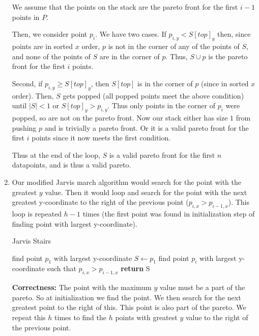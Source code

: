 \documentclass[11pt]{article}
\begin{document}
\begin{enumerate}[1. ]
    We assume that the points on the stack are the pareto front for the first $i-1$ points in $P$.

    Then, we consider point $p_i$. We have two cases. If $p_{i,y} < S[top]_y$ then, since points are in sorted $x$ order,
    $p$ is not in the corner of any of the points of $S$, and none of the points of $S$ are in the corner of $p$. Thus, $S \cup p$
    is the pareto front for the first $i$ points.

    Second, if $p_{i,y} \geq S[top]_y$, then $S[top]$ is in the corner of $p$ (since in sorted $x$ order). Then,
    $S$ gets popped (all popped points meet the above condition) until $|S| < 1$ or $S[top]_y > p_{i,y}$. Thus only points in the corner of $p_i$
    were popped, so are not on the pareto front. Now our stack either has size $1$ from pushing $p$ and is trivially a pareto front. 
    Or it is a valid pareto front for the first $i$ points since it now meets the first condition.

    Thus at the end of the loop, $S$ is a valid pareto front for the first $n$ datapoints, and is thus a valid pareto.

    \item Our modified Jarvis march algorithm would search for the point with the greatest $y$ value.
    Then it would loop and search for the point with the next greatest y-coordinate to the right of the previous point ($p_{i,x} > p_{i-1,x}$).
    This loop is repeated $h - 1$ times (the first point was found in initialization step of finding point with largest y-coordinate).

    \begin{algorithm}
        \caption{Jarvis Stairs}
        \label{alg:jarvis_stairs}
        \begin{algorithmic}[1]
            \State find point $p_1$ with largest y-coordinate
            \State $S \gets p_1$
                \State find point $p_i$ with largest y-coordinate such that $p_{i,x} > p_{i-1,x}$
            \EndFor
            \State \textbf{return} S
        \EndFunction
        \end{algorithmic}
    \end{algorithm}

    \textbf{Correctness:} The point with the maximum $y$ value must be a part of the pareto. So at initialization we find the point.
    We then search for the next greatest point to the right of this. This point is also part of the pareto. 
    We repeat this $h$ times to find the $h$ points with greatest $y$ value to the right of the previous point. 


\end{enumerate}
\end{document}
